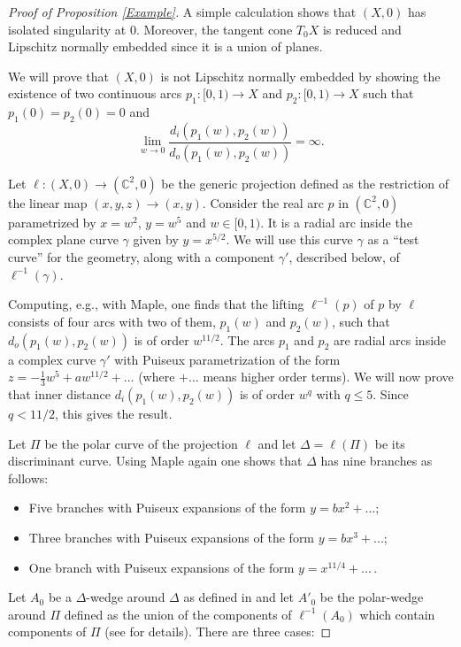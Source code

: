 \documentclass{amsart}
\begin{document}
\begin{proof} [Proof of Proposition \ref{Example}]
  A simple calculation shows that $(X,0)$ has isolated singularity at
  $0$. Moreover, the tangent cone $T_0X$ is reduced and Lipschitz
  normally embedded since it is a union of planes.

  We will prove that $(X,0)$ is not Lipschitz normally embedded by
  showing the existence of two continuous arcs
  $p_1 \colon [0,1) \to X$ and $p_2\colon [0,1) \to X$ such that
  $p_1(0)=p_2(0)=0$ and
  $$\lim_{w \to 0} \frac{d_i(p_1(w),p_2(w))}{d_o(p_1(w),p_2(w))} =
  \infty.$$
 
  Let $\ell \colon (X,0) \to (\mathbb C^2, 0)$ be the generic projection
  defined as the restriction of the linear map $(x,y,z) \to
  (x,y)$. Consider the real arc $p$ in $(\mathbb C^2,0)$ parametrized by
  $x=w^2$, $y= w^5$ and $w \in [0,1)$. It is a radial arc inside the
  complex plane curve $\gamma$ given by $y=x^{5/2}$. We will use this
  curve $\gamma$ as a ``test curve'' for the geometry, along with a
  component $\gamma'$, described below, of $\ell^{-1}(\gamma)$.

  Computing, e.g., with Maple, one finds that the lifting $\ell^{-1}(p)$ of
  $p$ by $\ell$ consists of four arcs with two of them, $p_1(w)$ and
  $p_2(w)$, such that $d_o(p_1(w), p_2(w))$ is of order $w^{11/2}$.
  The arcs $p_1$ and $p_2$ are radial arcs inside a complex curve
  $\gamma'$ with Puiseux parametrization of the form
  $z=-\frac{1}{3} w^5 + a w^{11/2}+...$  (where $+...$
    means higher order terms). 
We will now prove that inner distance $d_i(p_1(w), p_2(w))$ is of order $w^q$ with $q \leq 5$. Since $q<11/2$, this gives the result. 

Let $\Pi$ be the polar curve of the projection $\ell$ and let
$\Delta = \ell(\Pi)$ be its discriminant curve.  Using Maple again one
shows that $\Delta$ has nine branches as follows:
\begin{itemize}
\item Five  branches with Puiseux expansions of the form
  $y=b x^2 + ...$;
\item Three  branches with Puiseux expansions of the form
  $y=b x^3 + ... $;
\item One branch with Puiseux expansions of the form
  $y=x^{11/4} + ... $\,.
\end{itemize}

Let $A_0$ be a $\Delta$-wedge around $\Delta$ as defined in  \cite[Proposition 3.4]{BNP}   and let $A'_0$ be the polar-wedge around $\Pi$ defined as the union of the components of  $\ell^{-1}(A_0)$ which contain components of $\Pi$ (see
\cite[Section 3]{BNP} for details). There are three cases: 
 

\end{proof}
\end{document}
